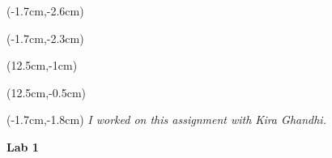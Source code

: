 \documentclass{article}
\begin{document}
\begin{textblock*}{3cm}(-1.7cm,-2.6cm)
\end{textblock*}

\begin{textblock*}{4cm}(-1.7cm,-2.3cm)
\end{textblock*}

\begin{textblock*}{8cm}(12.5cm,-1cm)
\end{textblock*}
\begin{textblock*}{3cm}(12.5cm,-0.5cm)
\end{textblock*}
\begin{textblock*}{13.5cm}(-1.7cm,-1.8cm)
  \noindent \textit{I worked on this assignment with Kira Ghandhi.}
\end{textblock*}

\vspace{1cm}

\begin{center}
  \textbf{\Large Lab 1}
\end{center}
\end{document}
